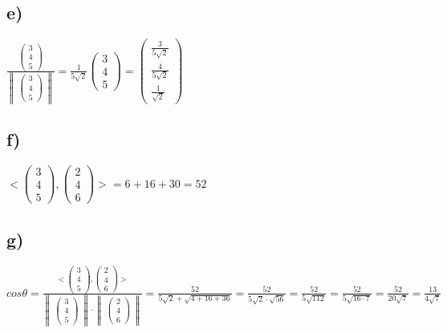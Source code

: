 \subsection*{e)}
$
\frac{\begin{pmatrix}
3 \\
4 \\
5
\end{pmatrix}}{
\begin{Vmatrix}
\begin{pmatrix}
3 \\
4 \\
5
\end{pmatrix}
\end{Vmatrix}}
=
\frac{1}{5\sqrt{2}}
\begin{pmatrix}
3 \\
4 \\
5
\end{pmatrix}
=
\begin{pmatrix}
\frac{3}{5\sqrt{2}} \\
\frac{4}{5\sqrt{2}} \\
\frac{1}{\sqrt{2}}
\end{pmatrix}
$
\subsection*{f)}
$
<
\begin{pmatrix}
3 \\
4 \\
5
\end{pmatrix}
,
\begin{pmatrix}
2 \\
4 \\
6
\end{pmatrix}
> = 6 + 16 + 30 = 52$
\subsection*{g)}
$
cos \theta = \frac{
<
\begin{pmatrix}
3 \\
4 \\
5
\end{pmatrix}
,
\begin{pmatrix}
2 \\
4 \\
6
\end{pmatrix}
>
}{
\begin{Vmatrix}
\begin{pmatrix}
3 \\
4 \\
5
\end{pmatrix}
\end{Vmatrix}
\cdot
\begin{Vmatrix}
\begin{pmatrix}
2 \\
4 \\
6
\end{pmatrix}
\end{Vmatrix}
} = \frac{52}{5\sqrt{2} + \sqrt{4 + 16 + 36}} = \frac{52}{5\sqrt{2} \cdot \sqrt{56}} = \frac{52}{5\sqrt{112}} = \frac{52}{5\sqrt{16 \cdot 7}} = \frac{52}{20\sqrt{7}} = \frac{13}{4\sqrt{7}}$
